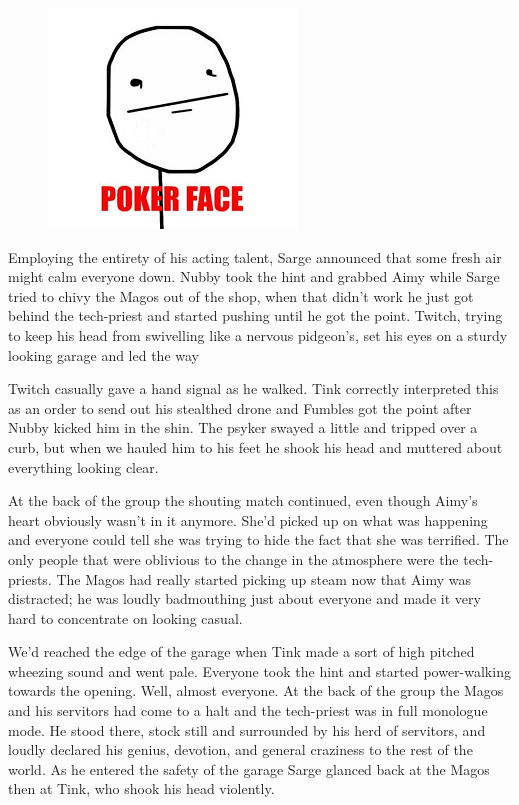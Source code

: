 \begin{figure}
	\begin{center}
		\includegraphics[width=\figwidth]{pics/11/21.png}
	\end{center}
\end{figure}
Employing the entirety of his acting talent, Sarge announced that some fresh air might calm everyone down. 
Nubby took the hint and grabbed Aimy while Sarge tried to chivy the Magos out of the shop, when that didn't work he just got behind the tech-priest and started pushing until he got the point. 
Twitch, trying to keep his head from swivelling like a nervous pidgeon's, set his eyes on a sturdy looking garage and led the way

Twitch casually gave a hand signal as he walked. 
Tink correctly interpreted this as an order to send out his stealthed drone and Fumbles got the point after Nubby kicked him in the shin. 
The psyker swayed a little and tripped over a curb, but when we hauled him to his feet he shook his head and muttered about everything looking clear.

At the back of the group the shouting match continued, even though Aimy's heart obviously wasn't in it anymore. 
She'd picked up on what was happening and everyone could tell she was trying to hide the fact that she was terrified. 
The only people that were oblivious to the change in the atmosphere were the tech-priests. 
The Magos had really started picking up steam now that Aimy was distracted; 
he was loudly badmouthing just about everyone and made it very hard to concentrate on looking casual.

We'd reached the edge of the garage when Tink made a sort of high pitched wheezing sound and went pale. 
Everyone took the hint and started power-walking towards the opening. 
Well, almost everyone. 
At the back of the group the Magos and his servitors had come to a halt and the tech-priest was in full monologue mode. 
He stood there, stock still and surrounded by his herd of servitors, and loudly declared his genius, devotion, and general craziness to the rest of the world. 
As he entered the safety of the garage Sarge glanced back at the Magos then at Tink, who shook his head violently.


